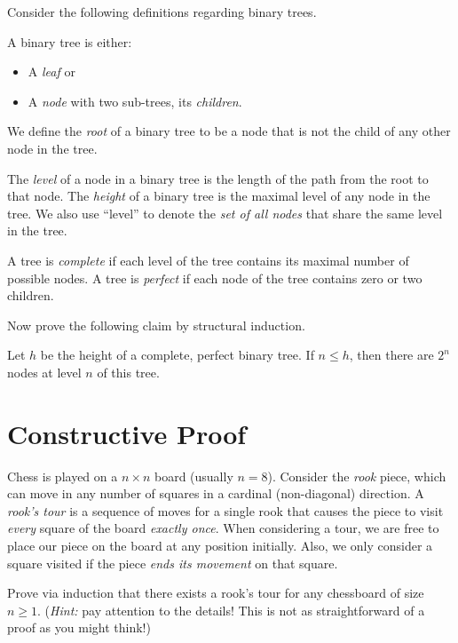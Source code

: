 \documentclass[11pt]{book}
\begin{document}
Consider the following definitions regarding binary trees.
\begin{defn}
  A binary tree is either:
  \begin{itemize}
    \item A \emph{leaf} or
    \item A \emph{node} with two sub-trees, its \emph{children}.
  \end{itemize}
  We define the \emph{root} of a binary tree to be a node that is not the child of any other node in the tree.
\end{defn}
\begin{defn}
  The \emph{level} of a node in a binary tree is the length of the path from the root to that node.
  The \emph{height} of a binary tree is the maximal level of any node in the tree.
  We also use ``level'' to denote the \emph{set of all nodes} that share the same level in the tree.
\end{defn}
\begin{defn}
  A tree is \emph{complete} if each level of the tree contains its maximal number of possible nodes.
  A tree is \emph{perfect} if each node of the tree contains zero or two children.
\end{defn}

Now prove the following claim by structural induction.
\begin{claim}
  Let \( h \) be the height of a complete, perfect binary tree.
  If \( n ≤ h \), then there are \( 2^n \) nodes at level \( n \) of this tree.
\end{claim}

\newpage

\section{Constructive Proof}

\turninproblem{}
Chess is played on a \( n × n \) board (usually \( n = 8 \)).
Consider the \emph{rook} piece, which can move in any number of squares in a cardinal (non-diagonal) direction.
A \emph{rook's tour} is a sequence of moves for a single rook that causes the piece to visit \emph{every} square of the board \emph{exactly once}.
When considering a tour, we are free to place our piece on the board at any position initially.
Also, we only consider a square visited if the piece \emph{ends its movement} on that square.

Prove via induction that there exists a rook's tour for any chessboard of size \( n ≥ 1 \).
(\emph{Hint:} pay attention to the details!
This is not as straightforward of a proof as you might think!)
\end{document}

